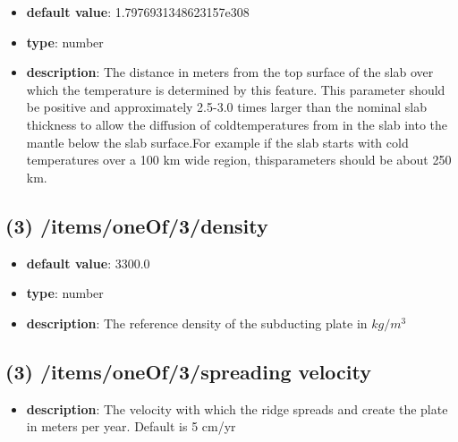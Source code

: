 \begin{itemize}[leftmargin=3em]\item {\bf default value}: 1.7976931348623157e308
\item {\bf type}: number
\item {\bf description}: The distance in meters from the top surface of the slab over which the temperature is determined by this feature. This parameter should be positive and approximately 2.5-3.0 times larger than the nominal slab thickness to allow the diffusion of coldtemperatures from in the slab into the mantle below the slab surface.For example if the slab starts with cold temperatures over a 100 km wide region, thisparameters should be about 250 km.
\end{itemize}\subsection{(3) /items/oneOf/3/density}
\begin{itemize}[leftmargin=3em]\item {\bf default value}: 3300.0
\item {\bf type}: number
\item {\bf description}: The reference density of the subducting plate in $kg/m^3$
\end{itemize}\subsection{(3) /items/oneOf/3/spreading velocity}
\begin{itemize}[leftmargin=3em]\item {\bf description}: The velocity with which the ridge spreads and create the plate in meters per year. Default is 5 cm/yr
\end{itemize}
